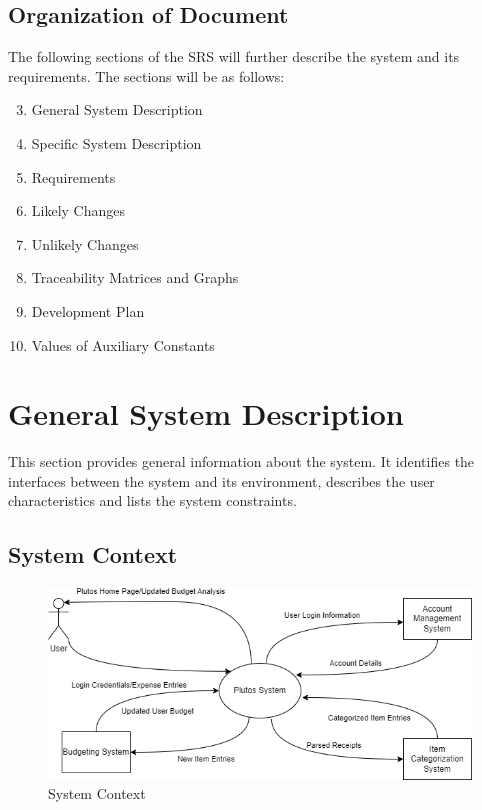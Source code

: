 \documentclass[12pt]{article}
\begin{document}
\subsection{Organization of Document}

The following sections of the SRS will further describe the system and its requirements. The sections will be as follows:

\begin{enumerate}
	\setcounter{enumi}{2}
	\item General System Description
	\item Specific System Description
	\item Requirements
	\item Likely Changes
	\item Unlikely Changes
	\item Traceability Matrices and Graphs
	\item Development Plan
	\item Values of Auxiliary Constants
\end{enumerate}

\newpage

\section{General System Description}

This section provides general information about the system.  It identifies the
interfaces between the system and its environment, describes the user
characteristics and lists the system constraints.  


\subsection{System Context}

\begin{figure}[h!]
  \centering
   \includegraphics[width=\textwidth]{SystemContext.png}
  \caption{System Context}
  \label{Fig_SystemContext} 
\end{figure}
\end{document}
